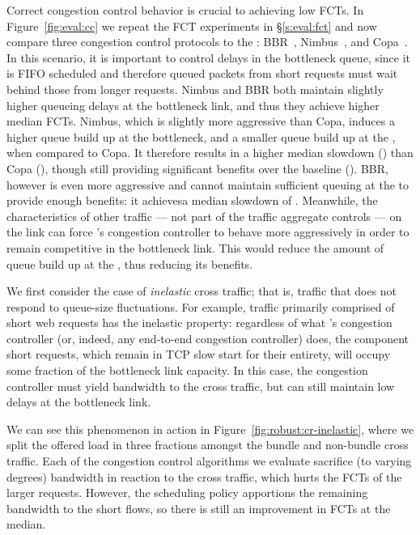

 Correct congestion control behavior is crucial to achieving low FCTs.
In Figure~\ref{fig:eval:cc} we repeat the FCT experiments in \S\ref{s:eval:fct} and now compare three congestion control protocols to the \baseline: BBR~\cite{bbr}, Nimbus~\cite{nimbus}, and Copa~\cite{copa}.
In this scenario, it is important to control delays in the bottleneck queue, since it is FIFO scheduled and therefore queued packets from short requests must wait behind those from longer requests. 
Nimbus and BBR both maintain slightly higher queueing delays at the bottleneck link, and thus they achieve higher median FCTs. 
Nimbus, which is slightly more aggressive than Copa, induces a higher queue build up at the bottleneck, and a smaller queue build up at the \name, when compared to Copa. It therefore results in a higher median slowdown (\ccNimbusMedian) than Copa (\ccCopaMedian), though still providing significant benefits over the baseline (\ccBaselineMedian). 
BBR, however is even more aggressive and cannot maintain sufficient queuing at the \name to provide enough benefits: it achievesa median slowdown of \ccBBRMedian.
Meanwhile, the characteristics of other traffic --- not part of the traffic aggregate \name controls --- on the link can force \name's congestion controller to behave more aggressively in order to remain competitive in the bottleneck link. This would reduce the amount of queue build up at the \name, thus reducing its benefits.


 We first consider the case of \emph{inelastic} cross traffic; that is, traffic that does not respond to queue-size fluctuations.
For example, traffic primarily comprised of short web requests has the inelastic property: regardless of what \name's congestion controller (or, indeed, any end-to-end congestion controller) does, the component short requests, which remain in TCP slow start for their entirety, will occupy some fraction of the bottleneck link capacity.
In this case, the congestion controller must yield bandwidth to the cross traffic, but can still maintain low delays at the bottleneck link.

We can see this phenomenon in action in Figure~\ref{fig:robust:cr-inelastic}, where we split the offered load in three fractions amongst the bundle and non-bundle cross traffic. 
Each of the congestion control algorithms we evaluate sacrifice (to varying degrees) bandwidth in reaction to the cross traffic, which hurts the FCTs of the larger requests.
However, the scheduling policy apportions the remaining bandwidth to the short flows, so there is still an improvement in FCTs at the median.

